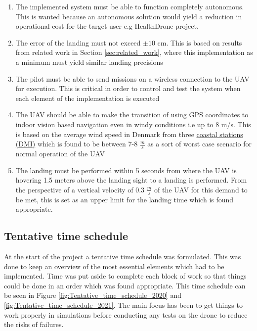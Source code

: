 \documentclass[../Head/report.tex]{subfiles}
\begin{document}
\begin{enumerate}[label=\textbf{R.\arabic*}]
	\item \label{sor:one} The implemented system must be able to function completely autonomous. This is wanted because an autonomous solution would yield a reduction in operational cost for the target user e.g HealthDrone project.   
    \item \label{sor:two} The error of the landing must not exceed $\pm 10$ cm. This is based on results from related work in Section \ref{sec:related_work}, where this implementation as a minimum must yield similar landing precisions
    \item \label{sor:three} The pilot must be able to send missions on a wireless connection to the UAV for execution. This is critical in order to control and test the system when each element of the implementation is executed 
    \item \label{sor:four} The UAV should be able to make the transition of using GPS coordinates to indoor vision based navigation even in windy conditions i.e up to 8 m/s. This is based on the average wind speed in Denmark from three \href{https://www.dmi.dk/klima/temaforside-klimaet-frem-til-i-dag/vind-i-danmark/}{coastal stations (DMI)} which is found to be between 7-8 $\frac{m}{s}$ as a sort of worst case scenario for normal operation of the UAV
    \item \label{sor:five} The landing must be performed within 5 seconds from where the UAV is hovering 1.5 meters above the landing sight to a landing is performed. From the perspective of a vertical velocity of 0.3 $\frac{m}{s}$ of the UAV for this demand to be met, this is set as an upper limit for the landing time which is found appropriate.   

\end{enumerate}


\newpage
\subsection{Tentative time schedule}
\label{sec:tentative_time_schedule}

At the start of the project a tentative time schedule was formulated. This was done to keep an overview of the most essential elements which had to be implemented. Time was put aside to complete each block of work so that things could be done in an order which was found appropriate.  This time schedule can be seen in Figure \ref{fig:Tentative_time_schedule_2020} and \ref{fig:Tentative_time_schedule_2021}. The main focus has been to get things to work properly in simulations before conducting any tests on the drone to reduce the risks of failures.   
\end{document}
